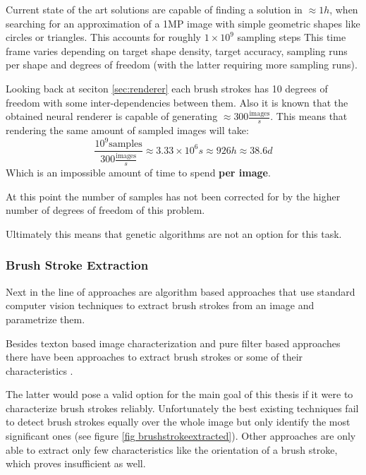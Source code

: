 Current state of the art solutions are capable of finding a solution in $\approx 1h$,
when searching for an approximation of a 1MP image with simple geometric shapes
like circles or triangles.
This accounts for roughly $1 \times 10^{9}$ sampling steps
This time frame varies depending on target shape density, target accuracy, sampling
runs per shape and degrees of freedom (with the latter requiring more sampling runs).

Looking back at seciton \ref{sec:renderer} each brush strokes has 10 degrees of freedom
with some inter-dependencies between them.
Also it is known that the obtained neural renderer is capable of generating $\approx
300 \frac{\text{images}}{s}$.
This means that rendering the same amount of sampled images will take:
$$
\frac{10^{9} \text{samples}}{300 \frac{\text{images}}{s}} \approx 3.33 \times 10^{6} s
\approx 926 h \approx 38.6 d
$$
Which is an impossible amount of time to spend \textbf{per image}.

At this point the number of samples has not been corrected for by the higher number of
degrees of freedom of this problem.

Ultimately this means that genetic algorithms are not an option for this task.

\subsubsection{Brush Stroke Extraction}
Next in the line of approaches are algorithm based approaches that use standard
computer vision techniques to extract brush strokes from an image and parametrize them.

Besides texton based image characterization \cite{textons} and pure filter based
approaches \cite{filters} there have been approaches to extract brush strokes or
some of their characteristics \cite{brushstrokecharacteristics} \cite{brushstrokeextraction}.

The latter would pose a valid option for the main goal of this thesis if it were to
characterize brush strokes reliably.
Unfortunately the best existing techniques fail to detect brush strokes equally 
over the whole image but only identify the most significant ones (see figure \ref{fig brushstrokeextracted}).
Other approaches are only able to extract only few characteristics like the orientation
of a brush stroke, which proves insufficient as well.

